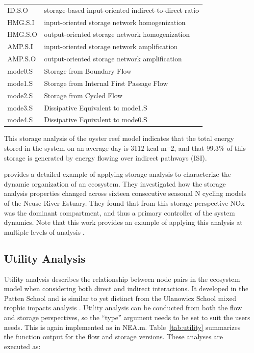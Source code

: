 \documentclass[article]{jss}
\begin{document}
\begin{table}[]
\begin{small}
\begin{tabularx}{\textwidth}{l l}
      ID.S.O & storage-based input-oriented indirect-to-direct ratio \citep[as in][]{fath06}\\
      HMG.S.I & input-oriented storage network homogenization \\
      HMG.S.O & output-oriented storage network homogenization\\
      AMP.S.I &  input-oriented storage network amplification \\
      AMP.S.O & output-oriented storage network amplification \\
      mode0.S & Storage from Boundary Flow \\
      mode1.S & Storage from Internal First Passage Flow \\
      mode2.S & Storage from Cycled Flow \\
      mode3.S & Dissipative Equivalent to mode1.S \\
      mode4.S & Dissipative Equivalent to mode0.S \\ \hline
    \end{tabularx}
\end{small}
\end{table}


This storage analysis of the oyster reef model indicates that the
total energy stored in the system on an average day is 3112 kcal
m$^-2$, and that 99.3\% of this storage is generated by energy flowing
over indirect pathways (ISI).

\citet{whipple2014} provides a detailed example of applying storage
analysis to characterize the dynamic organization of an ecosystem.
They investigated how the storage analysis properties
changed across sixteen consecutive seasonal N cycling models of the
Neuse River Estuary.  They found that from this storage perspective
NOx was the dominant compartment, and thus a primary controller of the
system dynamics.  Note that this work provides an example of applying
this analysis at multiple levels of analysis \citep[e.g.,][]{hines2014}.

\subsection{Utility Analysis}
Utility analysis describes the relationship between node pairs in the
ecosystem model when considering both direct and indirect
interactions.  It developed in the Patten School \citep{patten91,
  fath99_review} and is similar to yet distinct from the Ulanowicz
School mixed trophic impacts analysis \citep{ulanowicz90}.  Utility
analysis can be conducted from both the flow and storage perspectives,
so the ``type'' argument needs to be set to suit the users needs.
This is again implemented as in NEA.m.  Table~\ref{tab:utility}
summarizes the function output for the flow and storage
versions. These analyses are executed as:
\end{document}
